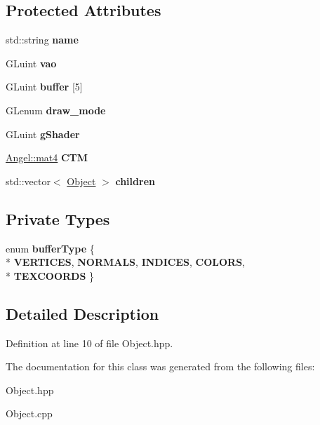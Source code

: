\subsection*{Protected Attributes}
\begin{DoxyCompactItemize}
\item 
\hypertarget{class_object_a24457e0a387492c80594aec7681a2277}{std\-::string {\bfseries name}}\label{class_object_a24457e0a387492c80594aec7681a2277}

\item 
\hypertarget{class_object_a66190fee29d03d6478516686cbd01eb8}{G\-Luint {\bfseries vao}}\label{class_object_a66190fee29d03d6478516686cbd01eb8}

\item 
\hypertarget{class_object_a5af1a967c6487d9a76f7a26c9c83e646}{G\-Luint {\bfseries buffer} \mbox{[}5\mbox{]}}\label{class_object_a5af1a967c6487d9a76f7a26c9c83e646}

\item 
\hypertarget{class_object_a82764b385767d989f27d301ab206acb8}{G\-Lenum {\bfseries draw\-\_\-mode}}\label{class_object_a82764b385767d989f27d301ab206acb8}

\item 
\hypertarget{class_object_a750782f8b8c5d53bfa6ea614e079729c}{G\-Luint {\bfseries g\-Shader}}\label{class_object_a750782f8b8c5d53bfa6ea614e079729c}

\item 
\hypertarget{class_object_a2cd107c747ea674c28216b9ccd160f38}{\hyperlink{class_angel_1_1mat4}{Angel\-::mat4} {\bfseries C\-T\-M}}\label{class_object_a2cd107c747ea674c28216b9ccd160f38}

\item 
\hypertarget{class_object_a8913b59fc17424e984c599b9335ab69b}{std\-::vector$<$ \hyperlink{class_object}{Object} $>$ {\bfseries children}}\label{class_object_a8913b59fc17424e984c599b9335ab69b}

\end{DoxyCompactItemize}
\subsection*{Private Types}
\begin{DoxyCompactItemize}
\item 
enum {\bfseries buffer\-Type} \{ \\*
{\bfseries V\-E\-R\-T\-I\-C\-E\-S}, 
{\bfseries N\-O\-R\-M\-A\-L\-S}, 
{\bfseries I\-N\-D\-I\-C\-E\-S}, 
{\bfseries C\-O\-L\-O\-R\-S}, 
\\*
{\bfseries T\-E\-X\-C\-O\-O\-R\-D\-S}
 \}
\end{DoxyCompactItemize}


\subsection{Detailed Description}


Definition at line 10 of file Object.\-hpp.



The documentation for this class was generated from the following files\-:\begin{DoxyCompactItemize}
\item 
Object.\-hpp\item 
Object.\-cpp\end{DoxyCompactItemize}
